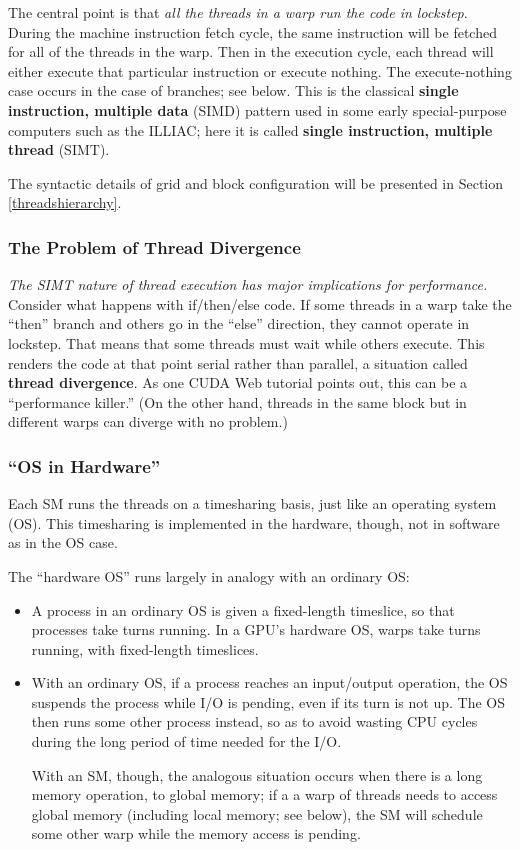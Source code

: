 The central point is that {\it all the threads in a warp run the code in
lockstep}.  During the machine instruction fetch cycle, the same
instruction will be fetched for all of the threads in the warp.  Then in
the execution cycle, each thread will either execute that particular
instruction or execute nothing.   The execute-nothing case occurs in the
case of branches; see below.  This is the classical {\bf single
instruction, multiple data} (SIMD) pattern used in some early
special-purpose computers such as the ILLIAC; here it is called {\bf
single instruction, multiple thread} (SIMT).

The syntactic details of grid and block configuration will be presented
in Section \ref{threadshierarchy}.

\subsubsection{The Problem of Thread Divergence}

{\it The SIMT nature of thread execution has major implications for
performance.}  Consider what happens with if/then/else code.  If some
threads in a warp take the ``then'' branch and others go in the ``else''
direction, they cannot operate in lockstep.  That means that some
threads must wait while others execute.  This renders the code at that
point serial rather than parallel, a situation called {\bf thread
divergence}.  As one CUDA Web tutorial points out, this can be a
``performance killer.''  (On the other hand, threads in the same block
but in different warps can diverge with no problem.)

\subsubsection{``OS in Hardware''}

Each SM runs the threads on a timesharing basis, just like an operating
system (OS).  This timesharing is implemented in the hardware, though,
not in software as in the OS case.  

The ``hardware OS'' runs largely in analogy with an ordinary OS:

\begin{itemize}

\item A process in an ordinary OS is given a fixed-length timeslice, so
that processes take turns running. In a GPU's hardware OS, warps take
turns running, with fixed-length timeslices.

\item With an ordinary OS, if a process reaches an input/output
operation, the OS suspends the process while I/O is pending, even if its
turn is not up.  The OS then runs some other process instead, so as to
avoid wasting CPU cycles during the long period of time needed for the
I/O.  

With an SM, though, the analogous situation occurs when there is a long
memory operation, to global memory; if a a warp of threads needs to
access global memory (including local memory; see below), the SM will
schedule some other warp while the memory access is pending.

\end{itemize}

